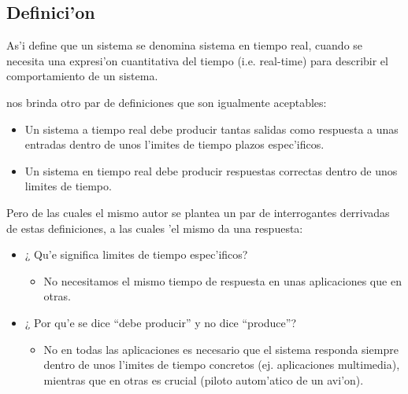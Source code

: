 



\subsection{Definici'on}



As'i \citet{mall} define que un sistema se denomina sistema en tiempo real, cuando se necesita una expresi'on cuantitativa del tiempo (i.e. real-time) para describir el comportamiento de un sistema.

\citet{ortiz} nos brinda otro par de definiciones que son igualmente aceptables:

\begin{itemize}
	\item Un sistema a tiempo real debe producir tantas salidas como respuesta a unas entradas dentro de unos l'imites de tiempo plazos espec'ificos.
\item  Un sistema en tiempo real debe producir respuestas correctas dentro de unos limites de tiempo.
\end{itemize}

Pero de las cuales el mismo autor \citet{ortiz} se plantea un par de interrogantes derrivadas de estas definiciones, a las cuales 'el mismo da una respuesta:

\begin{itemize}
	\item ¿ Qu'e significa limites de tiempo espec'ificos?
	
	\begin{itemize}
		\item No necesitamos el mismo tiempo de respuesta en unas aplicaciones
que en otras.
	\end{itemize}
	\item¿ Por qu'e se dice ``debe producir'' y no dice ``produce''?

\begin{itemize}
	\item No en todas las aplicaciones es necesario que el sistema responda
siempre dentro de unos l'imites de tiempo concretos (ej. aplicaciones
multimedia), mientras que en otras es crucial (piloto autom'atico de
un avi'on).
\end{itemize}
\end{itemize}


